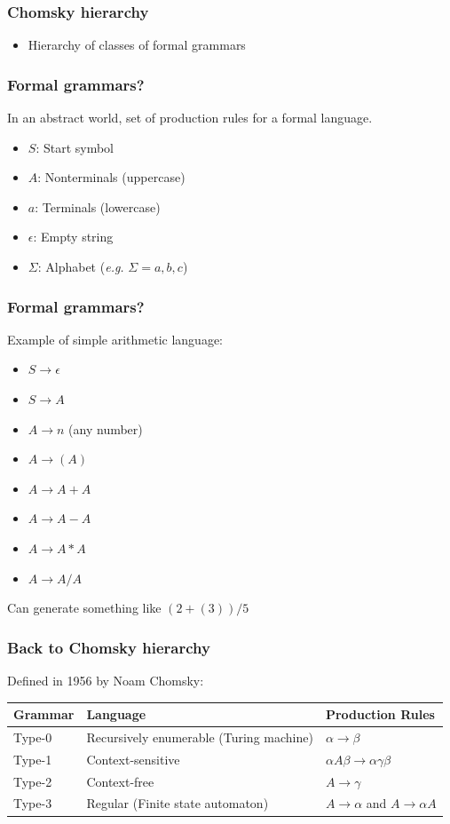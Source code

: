 \documentclass[aspectratio=169,xcolor=table]{beamer}
\begin{document}
\begin{frame}
  \frametitle{Chomsky hierarchy}
  \begin{itemize}
  \item Hierarchy of classes of formal grammars
  \end{itemize}
\end{frame}


\begin{frame}
  \frametitle{Formal grammars?}
  In an abstract world, set of production rules for a formal language.
  \begin{itemize}
  \item $S$: Start symbol
  \item $A$: Nonterminals (uppercase)
  \item $a$: Terminals (lowercase)
  \item $\epsilon$: Empty string
  \item $\Sigma$: Alphabet (\textit{e.g.} $\Sigma = {a, b, c}$)
  \end{itemize}
\end{frame}


\begin{frame}
  \frametitle{Formal grammars?}
  Example of simple arithmetic language:
  \begin{itemize}
  \item $S \to \epsilon$
  \item $S \to A$
  \item $A \to n$ (any number)
  \item $A \to ( A )$
  \item $A \to A + A$
  \item $A \to A - A$
  \item $A \to A * A$
  \item $A \to A / A$
  \end{itemize}
  Can generate something like $(2 + (3)) / 5$
\end{frame}


\begin{frame}
  \frametitle{Back to Chomsky hierarchy}
  Defined in 1956 by Noam Chomsky:
  \begin{center}
    \begin{tabular}{l!{\vrule}l!{\vrule}l}
      Grammar & Language & Production Rules \\ \hline
      Type-0  & Recursively enumerable (Turing machine) & $\alpha \to \beta$ \\
      Type-1  & Context-sensitive & $\alpha A \beta \to \alpha \gamma \beta$ \\
      Type-2  & Context-free & $A \to \gamma$ \\
      Type-3  & Regular (Finite state automaton) & $A \to \alpha$ and $A \to \alpha A$ \\
    \end{tabular}
  \end{center}
\end{frame}
\end{document}
